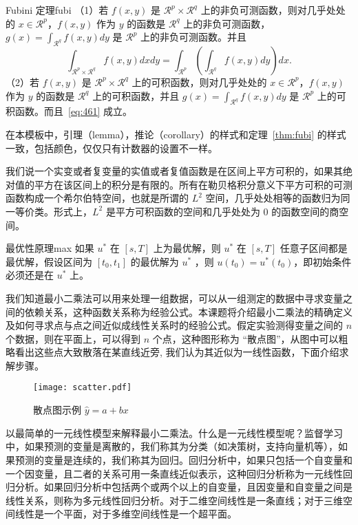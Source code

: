 \documentclass[cn,11pt,fancy]{elegantbook}
\begin{document}
\begin{theorem}{Fubini 定理}{fubi} 
（1）若 $f(x,y)$ 是 $\mathcal{R}^p\times\mathcal{R}^q$ 上的非负可测函数，则对几乎处处的 $x\in \mathcal{R}^p$，$f(x,y)$ 作为 $y$ 的函数是 $\mathcal{R}^q$ 上的非负可测函数，$g(x)=\int_{\mathcal{R}^q}f(x,y) dy$ 是 $\mathcal{R}^p$ 上的非负可测函数。并且
\begin{equation}
   \label{eq:461}
   \int_{\mathcal{R}^p\times\mathcal{R}^q} f(x,y) dxdy=\int_{\mathcal{R}^p}\left(\int_{\mathcal{R}^q}f(x,y)dy\right)dx.
\end{equation}
（2）若 $f(x,y)$ 是 $\mathcal{R}^p\times\mathcal{R}^q$ 上的可积函数，则对几乎处处的 $x\in\mathcal{R}^p$，$f(x,y)$ 作为 $y$ 的函数是 $\mathcal{R}^q$ 上的可积函数，并且 $g(x)=\int_{\mathcal{R}^q}f(x,y) dy$ 是 $\mathcal{R}^p$ 上的可积函数。而且~\ref{eq:461} 成立。
\end{theorem}

\begin{note}
在本模板中，引理（lemma），推论（corollary）的样式和定理~\ref{thm:fubi} 的样式一致，包括颜色，仅仅只有计数器的设置不一样。
\end{note}

我们说一个实变或者复变量的实值或者复值函数是在区间上平方可积的，如果其绝对值的平方在该区间上的积分是有限的。所有在勒贝格积分意义下平方可积的可测函数构成一个希尔伯特空间，也就是所谓的 $L^2$ 空间，几乎处处相等的函数归为同一等价类。形式上，$L^2$ 是平方可积函数的空间和几乎处处为 0 的函数空间的商空间。

\begin{proposition}{最优性原理}{max}
如果 $u^*$ 在 $[s,T]$ 上为最优解，则 $u^*$ 在 $[s, T]$ 任意子区间都是最优解，假设区间为 $[t_0, t_1]$ 的最优解为 $u^*$ ，则 $u(t_0)=u^{*}(t_0)$，即初始条件必须还是在 $u^*$ 上。
\end{proposition}

我们知道最小二乘法可以用来处理一组数据，可以从一组测定的数据中寻求变量之间的依赖关系，这种函数关系称为经验公式。本课题将介绍最小二乘法的精确定义及如何寻求点与点之间近似成线性关系时的经验公式。假定实验测得变量之间的 $n$ 个数据，则在平面上，可以得到 $n$ 个点，这种图形称为 “散点图”，从图中可以粗略看出这些点大致散落在某直线近旁, 我们认为其近似为一线性函数，下面介绍求解步骤。

\begin{figure}[htbp]
	\centering
	\texttt{[image: scatter.pdf]}
	\caption{散点图示例 $\hat{y}=a+bx$ \label{fig:scatter}}
\end{figure}

以最简单的一元线性模型来解释最小二乘法。什么是一元线性模型呢？监督学习中，如果预测的变量是离散的，我们称其为分类（如决策树，支持向量机等），如果预测的变量是连续的，我们称其为回归。回归分析中，如果只包括一个自变量和一个因变量，且二者的关系可用一条直线近似表示，这种回归分析称为一元线性回归分析。如果回归分析中包括两个或两个以上的自变量，且因变量和自变量之间是线性关系，则称为多元线性回归分析。对于二维空间线性是一条直线；对于三维空间线性是一个平面，对于多维空间线性是一个超平面。
\end{document}
